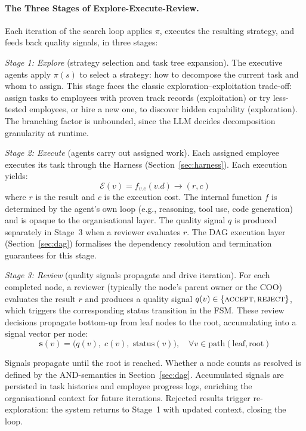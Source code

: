 \documentclass[11pt,a4paper]{article}
\begin{document}
\paragraph{The Three Stages of Explore-Execute-Review.}
Each iteration of the search loop applies $\pi$, executes the resulting strategy, and feeds back quality signals, in three stages:

\textit{Stage 1: Explore} (strategy selection and task tree expansion).
The executive agents apply $\pi(s)$ to select a strategy: how to decompose the current task and whom to assign.  This stage faces the classic exploration--exploitation trade-off: assign tasks to employees with proven track records (exploitation) or try less-tested employees, or hire a new one, to discover hidden capability (exploration).  The branching factor is unbounded, since the LLM decides decomposition granularity at runtime.

\textit{Stage 2: Execute} (agents carry out assigned work).
Each assigned employee executes its task through the Harness (Section~\ref{sec:harness}).  Each execution yields:
\begin{equation}
\mathcal{E}(v) = f_{v.e}(v.d) \to (r, c)
\end{equation}
where $r$ is the result and $c$ is the execution cost.  The internal function $f$ is determined by the agent's own loop (e.g., reasoning, tool use, code generation) and is opaque to the organisational layer.  The quality signal $q$ is produced separately in Stage~3 when a reviewer evaluates $r$.  The DAG execution layer (Section~\ref{sec:dag}) formalises the dependency resolution and termination guarantees for this stage.

\textit{Stage 3: Review} (quality signals propagate and drive iteration).
For each completed node, a reviewer (typically the node's parent owner or the COO) evaluates the result $r$ and produces a quality signal $q(v) \in \{\textsc{accept}, \textsc{reject}\}$, which triggers the corresponding status transition in the FSM.  These review decisions propagate bottom-up from leaf nodes to the root, accumulating into a signal vector per node:
\begin{equation}
\mathbf{s}(v) = \bigl(q(v),\; c(v),\; \text{status}(v)\bigr), \quad \forall v \in \text{path}(\text{leaf}, \text{root})
\end{equation}

Signals propagate until the root is reached.  Whether a node counts as resolved is defined by the AND-semantics in Section~\ref{sec:dag}.  Accumulated signals are persisted in task histories and employee progress logs, enriching the organisational context for future iterations.  Rejected results trigger re-exploration: the system returns to Stage~1 with updated context, closing the loop.
\end{document}
